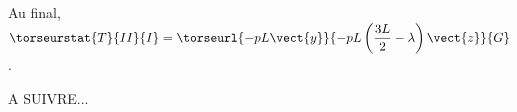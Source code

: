 Au final, $\torseurstat{T}{II}{I} = \torseurl{-pL\vect{y}}{- pL \left(\dfrac{3L}{2}-\lambda\right) \vect{z}}{G}$.


A SUIVRE...
%
%
%
%
%
%
%
%
%
%
%
%
%
%





\else

\fi

\ifprof
\else
\fi



\ifprof
\begin{figure}[H]
\centering
\end{figure}
\else



\fi